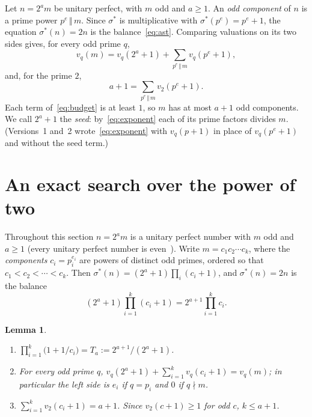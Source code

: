 \documentclass[11pt]{amsart}
\theoremstyle{plain}
\newtheorem{lemma}[theorem]{Lemma}
\theoremstyle{definition}
\begin{document}
Let $n=2^am$ be unitary perfect, with $m$ odd and $a\ge1$.  An \emph{odd
component} of $n$ is a prime power $p^e\,\Vert\, m$.  Since $\sigma^*$ is
multiplicative with $\sigma^*(p^e)=p^e+1$, the equation $\sigma^*(n)=2n$ is the
balance~\eqref{eq:ast}.  Comparing valuations on its two sides gives, for every
odd prime $q$,
\begin{equation}\label{eq:exponent}
v_q(m)=v_q(2^a+1)+\sum_{p^e\,\Vert\, m}v_q(p^e+1),
\end{equation}
and, for the prime $2$,
\begin{equation}\label{eq:budget}
a+1=\sum_{p^e\,\Vert\, m}v_2(p^e+1).
\end{equation}
Each term of~\eqref{eq:budget} is at least $1$, so $m$ has at most $a+1$ odd
components.  We call $2^a+1$ the \emph{seed}: by~\eqref{eq:exponent} each of its
prime factors divides $m$.  (Versions~1 and~2 wrote~\eqref{eq:exponent} with
$v_q(p+1)$ in place of $v_q(p^e+1)$ and without the seed term.)

\section{An exact search over the power of two}\label{sec:search}

Throughout this section $n=2^a m$ is a unitary perfect number with $m$ odd and
$a\ge 1$ (every unitary perfect number is even~\cite{SW1966}).  Write
$m=c_1c_2\cdots c_k$, where the \emph{components} $c_i=p_i^{e_i}$ are powers of
distinct odd primes, ordered so that $c_1<c_2<\cdots<c_k$.  Then
$\sigma^*(n)=(2^a+1)\prod_i(c_i+1)$, and $\sigma^*(n)=2n$ is the balance
\begin{equation}\label{eq:balance}
(2^a+1)\prod_{i=1}^{k}(c_i+1)=2^{a+1}\prod_{i=1}^{k}c_i .
\end{equation}

\begin{lemma}\label{lem:balance}
\begin{enumerate}[label=(\roman*),leftmargin=*]
\item $\prod_{i=1}^{k}\bigl(1+1/c_i\bigr)=T_a:=2^{a+1}/(2^a+1)$.
\item For every odd prime $q$,
$v_q(2^a+1)+\sum_{i=1}^{k}v_q(c_i+1)=v_q(m)$; in particular the left side
is $e_i$ if $q=p_i$ and $0$ if $q\nmid m$.
\item $\sum_{i=1}^{k}v_2(c_i+1)=a+1$. Since $v_2(c+1)\ge 1$ for odd $c$,
$k\le a+1$.
\end{enumerate}
\end{lemma}
\end{document}
